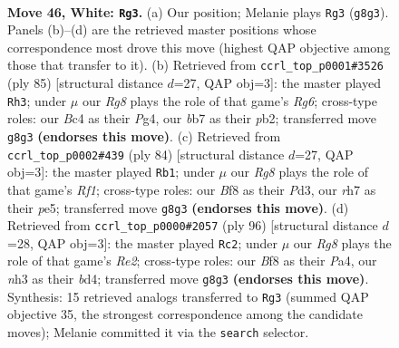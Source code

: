 \documentclass[11pt]{article}
\begin{document}
\clearpage

\begin{figure}[p]\centering
\begin{subfigure}{0.46\textwidth}\centering
\resizebox{\linewidth}{!}{%
\newchessgame
\chessboard[
  setfen={5BR1/pb1p3r/8/5k2/2B5/7n/PPK5/8 w - - 12 46},
  showmover=false,
  pgfstyle=straightmove, color=movearrow, markmove={g8-g3}
]}
\caption{}
\end{subfigure}\hfill
\begin{subfigure}{0.46\textwidth}\centering
\resizebox{\linewidth}{!}{%
\newchessgame
\chessboard[
  setfen={8/R7/3k4/1P6/N5p1/5br1/PP6/5K2 b - - 0 43},
  showmover=false,
  pgfstyle=straightmove, color=movearrow, markmove={g3-h3}
]}
\caption{}
\end{subfigure}
\\[4pt]
\begin{subfigure}{0.46\textwidth}\centering
\resizebox{\linewidth}{!}{%
\newchessgame
\chessboard[
  setfen={8/6k1/3r4/4p1b1/1p1pB3/3P4/7P/5R1K w - - 0 43},
  showmover=false,
  pgfstyle=straightmove, color=movearrow, markmove={f1-b1}
]}
\caption{}
\end{subfigure}\hfill
\begin{subfigure}{0.46\textwidth}\centering
\resizebox{\linewidth}{!}{%
\newchessgame
\chessboard[
  setfen={3r4/8/1p5p/pB1k4/P2b4/6P1/4R1K1/8 w - - 11 49},
  showmover=false,
  pgfstyle=straightmove, color=movearrow, markmove={e2-c2}
]}
\caption{}
\end{subfigure}
\caption{\textbf{Move 46, White: \texttt{Rg3}.} (a) Our position; Melanie plays \texttt{Rg3} (\texttt{g8g3}). Panels (b)--(d) are the retrieved master positions whose correspondence most drove this move (highest QAP objective among those that transfer to it). (b) Retrieved from \texttt{ccrl\_top\_p0001\#3526} (ply 85) [structural distance $d$=27, QAP obj=3]: the master played \texttt{Rh3}; under $\mu$ our \emph{Rg8} plays the role of that game's \emph{Rg6}; cross-type roles: our \emph{B}c4 as their \emph{P}g4, our \emph{b}b7 as their \emph{p}b2; transferred move \texttt{g8g3} \textbf{(endorses this move)}. (c) Retrieved from \texttt{ccrl\_top\_p0002\#439} (ply 84) [structural distance $d$=27, QAP obj=3]: the master played \texttt{Rb1}; under $\mu$ our \emph{Rg8} plays the role of that game's \emph{Rf1}; cross-type roles: our \emph{B}f8 as their \emph{P}d3, our \emph{r}h7 as their \emph{p}e5; transferred move \texttt{g8g3} \textbf{(endorses this move)}. (d) Retrieved from \texttt{ccrl\_top\_p0000\#2057} (ply 96) [structural distance $d$=28, QAP obj=3]: the master played \texttt{Rc2}; under $\mu$ our \emph{Rg8} plays the role of that game's \emph{Re2}; cross-type roles: our \emph{B}f8 as their \emph{P}a4, our \emph{n}h3 as their \emph{b}d4; transferred move \texttt{g8g3} \textbf{(endorses this move)}. Synthesis: 15 retrieved analogs transferred to \texttt{Rg3} (summed QAP objective 35, the strongest correspondence among the candidate moves); Melanie committed it via the \texttt{search} selector.}
\label{fig:thought-m90}
\end{figure}
\end{document}
